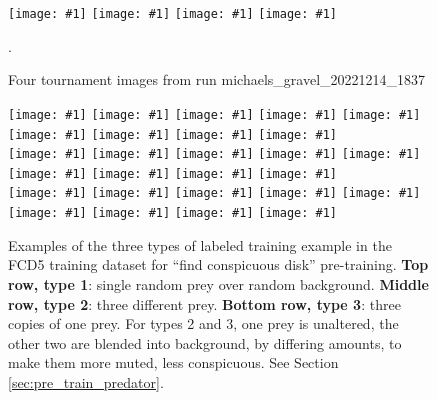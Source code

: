 \documentclass[acmtog]{acmart}
\newcommand{\igfour}[1]{\texttt{[image: \#1]}}
\newcommand{\ignine}[1]{\texttt{[image: \#1]}}
\begin{document}
\begin{figure}
    \igfour{20221215_step_5867.png}
    \hfill
    \igfour{20221215_step_5892.png}
    \hfill
    \igfour{20221215_step_6830.png}
    \hfill
    \igfour{20221215_step_6916.png}
    \caption{Four tournament images from run michaels\_gravel\_20221214\_1837}.
    \label{fig:michaels_gravel_4x}
\end{figure}

\begin{figure}
    \ignine{20220303_UVSfqCzewt_38_20.png}
    \hfill
    \ignine{20220303_SBWaLRHOzk_56_33.png}
    \hfill
    \ignine{20220303_bUMqcbutgJ_25_78.png}
    \hfill
    \ignine{20220303_HZzUzWWqcC_54_28.png}
    \hfill
    \ignine{20220303_inuPKUxnHQ_72_71.png}
    \hfill
    \ignine{20220303_RRGCwhmcJc_101_84.png}
    \hfill
    \ignine{20220303_PYinyJAWaj_61_60.png}
    \hfill
    \ignine{20220303_TNXfhQtzYa_92_91.png}
    \hfill
    \ignine{20220303_cDMtFaTYKk_63_54.png}
    \\
    \vspace{0.1cm}
    \ignine{20220303_wIRPERwSCh_49_63.png}
    \hfill
    \ignine{20220303_edDsCjbHdf_61_92.png}
    \hfill
    \ignine{20220303_fGMFBgMQDX_93_86.png}
    \hfill
    \ignine{20220303_jQREPLQyuL_33_39.png}
    \hfill
    \ignine{20220303_ijBOHTccYX_104_101.png}
    \hfill
    \ignine{20220303_KAoOFAqFyU_80_58.png}
    \hfill
    \ignine{20220303_NExMwxEbzU_85_92.png}
    \hfill
    \ignine{20220303_kpcUyhHXOh_91_98.png}
    \hfill
    \ignine{20220303_oWPwPGkcSb_82_22.png}
    \\
    \vspace{0.1cm}
    \ignine{20220303_uAEPxMZbeo_83_45.png}
    \hfill
    \ignine{20220303_cADfBauZUV_47_32.png}
    \hfill
    \ignine{20220303_YAMfudJxeH_30_84.png}
    \hfill
    \ignine{20220303_JeyBgDfMcN_40_82.png}
    \hfill
    \ignine{20220303_OaOJaByhbU_90_55.png}
    \hfill
    \ignine{20220303_mhYpDjxaKf_78_57.png}
    \hfill
    \ignine{20220303_ASsEgFUlly_23_60.png}
    \hfill
    \ignine{20220303_nzgItDrYqT_71_99.png}
    \hfill
    \ignine{20220303_QuHYtnPora_72_73.png}
    \caption{Examples of the three types of labeled training example in the FCD5 training dataset for “find conspicuous disk” pre-training. \textbf{Top row, type 1}: single random prey over random background. \textbf{Middle row, type 2}: three different prey. \textbf{Bottom row, type 3}: three copies of one prey. For types 2 and 3, one prey is unaltered, the other two are blended into background, by differing amounts, to make them more muted, less conspicuous. See Section \ref{sec:pre_train_predator}.}
    \label{fig:fcd5_examples}
\end{figure}
\end{document}
